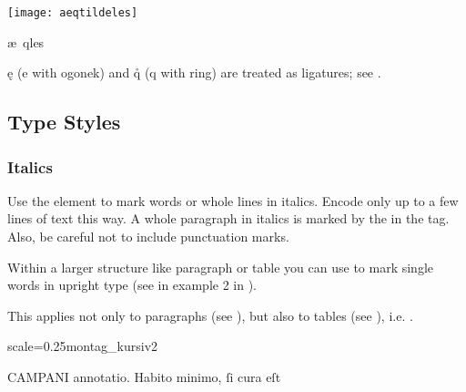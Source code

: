 \begin{example}

\texttt{[image: aeqtildeles]}

\vspace{-3mm}
\begin{typeLatin}
æ\bs~qles
\end{typeLatin}

\end{example}

\begin{note}
\k{e} (e with ogonek) and \r{q} (q with ring) are treated as ligatures; see .
\end{note}


\tocspace
\subsection{Type Styles}
\label{sec:type-styles}
\subsubsection{Italics}
\label{section italics}

\begin{mainrule}
Use the element  to mark words or whole lines in italics. Encode only up to a few lines of text this way. A whole paragraph in italics is marked by the  in the  tag. Also, be careful not to include punctuation marks.

  Within a larger  structure like paragraph or table you can use  to mark single words in upright type (see  in example 2 in ).
\end{mainrule}

\begin{clarification}
  This applies not only to paragraphs (see ), but also to tables (see ), i.e. .

\end{clarification}

\begin{sampleImageSmall}{scale=0.25}{montag_kursiv2}
\begin{typeLatin}
CAMPANI annotatio. Habito minimo, ſi cura eſt
\end{typeLatin}
\end{sampleImageSmall}

